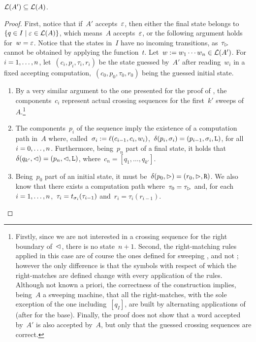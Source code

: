 \begin{lemm}\label{lem:swkLAtoNFA-2}
	$\mathcal L(A')\subseteq\mathcal L(A)$.
\end{lemm}
\begin{proof}
	First, notice that if~$A'$ accepts~$\varepsilon$, then either the final state belongs to~$\{q\in I\mid \varepsilon\in\mathcal L(A)\}$, which means~$A$ accepts~$\varepsilon$, or the following argument holds for~$w=\varepsilon$.
	Notice that the states in~$I$ have no incoming transitions, as~$\tau_\rhd$ cannot be obtained by applying the function~$t$.
	Let~$w:=w_1\cdots w_n\in\mathcal L(A')$. For~$i=1,\dots,n$, let~$(c_i,p_i,\tau_i,r_i)$ be the state guessed by~$A'$ after reading~$w_i$ in a fixed accepting computation,~$(c_0,p_0,\tau_0,r_0)$ being the guessed initial state.
	\begin{enumerate}
		\item By a very similar argument to the one presented for the proof of , the components~$c_i$ represent actual crossing sequences for the first~$k'$ sweeps of~$A$.\footnote{%
			      Firstly, since we are not interested in a crossing sequence for the right boundary of~$\lhd$, there is no state~$n+1$.
			      Second, the right-matching rules applied in this case are of course the ones defined for sweeping \kDLAs, and not \TDFAs; however the only difference is that the symbols with respect of which the right-matches are defined change with every application of the rules.
			      Although not known a priori, the correctness of the construction implies, being~$A$ a sweeping machine, that all the right-matches, with the sole exception of the one including~$[q_I]$, are built by alternating applications of  (after  for the base).
			      Finally, the proof does not show that a word accepted by~$A'$ is also accepted by~$A$, but only that the guessed crossing sequences are correct.}
		\item The components~$p_i$ of the sequence imply the existence of a computation path in~$A$ where, called~$\sigma_i:=\ell(c_{i-1},c_i,w_i)$,~$\delta(p_i,\sigma_i)=(p_{i-1},\sigma_i,\mathtt L)$, for all~$i=0,\dots,n$.
		      Furthermore, being~$p_n$ part of a final state, it holds that~$\delta(q_{k'},\lhd)=(p_n,\lhd,\mathtt L)$, where~$c_n=[q_1,\dots,q_{k'}]$.
		\item Being~$p_0$ part of an initial state, it must be~$\delta(p_0,\rhd)=(r_0,\rhd,\mathtt R)$.
		      We also know that there exists a computation path where~$\tau_0=\tau_\rhd$ and, for each~$i=1,\dots,n$,~$\tau_i=t_{\sigma_i}(\tau_{i-1})$ and~$r_i=\tau_i(r_{i-1})$.

\end{enumerate}
\end{proof}
